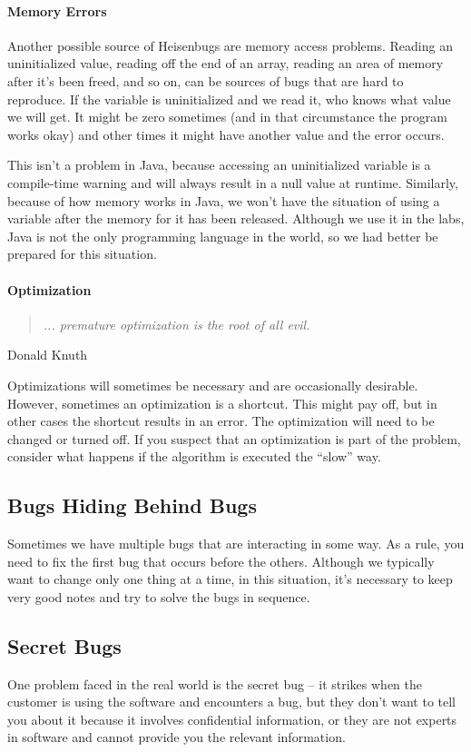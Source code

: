 \paragraph{Memory Errors}
Another possible source of Heisenbugs are memory access problems. Reading an uninitialized value, reading off the end of an array, reading an area of memory after it's been freed, and so on, can be sources of bugs that are hard to reproduce. If the variable is uninitialized and we read it, who knows what value we will get. It might be zero sometimes (and in that circumstance the program works okay) and other times it might have another value and the error occurs.

This isn't a problem in Java, because accessing an uninitialized variable is a compile-time warning and will always result in a null value at runtime. Similarly, because of how memory works in Java, we won't have the situation of using a variable after the memory for it has been released. Although we use it in the labs, Java is not the only programming language in the world, so we had better be prepared for this situation.

\paragraph{Optimization}
\begin{quote}
	\emph{... premature optimization is the root of all evil.}
\end{quote}
\hfill Donald Knuth

Optimizations will sometimes be necessary and are occasionally desirable. However, sometimes an optimization is a shortcut. This might pay off, but in other cases the shortcut results in an error. The optimization will need to be changed or turned off. If you suspect that an optimization is part of the problem, consider what happens if the algorithm is executed the ``slow'' way.


\subsection*{Bugs Hiding Behind Bugs}
Sometimes we have multiple bugs that are interacting in some way. As a rule, you need to fix the first bug that occurs before the others. Although we typically want to change only one thing at a time, in this situation, it's necessary to keep very good notes and try to solve the bugs in sequence.

\subsection*{Secret Bugs}
One problem faced in the real world is the secret bug -- it strikes when the customer is using the software and encounters a bug, but they don't want to tell you about it because it involves confidential information, or they are not experts in software and cannot provide you the relevant information.


